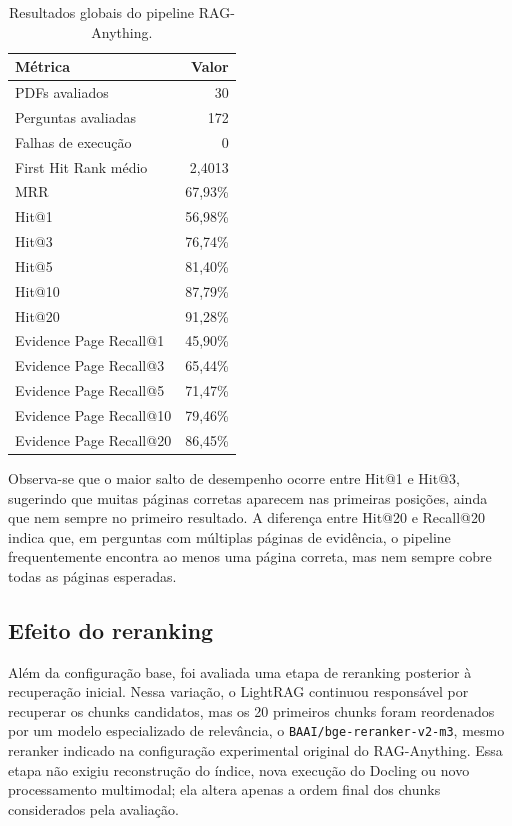 \begin{table}[htbp]
\centering
\caption{Resultados globais do pipeline RAG-Anything.}
\label{tab:resultados-gerais-raganything}
\small
\begin{tabular}{p{6.6cm}r}
\toprule
\textbf{Métrica} & \textbf{Valor} \\
\midrule
PDFs avaliados & 30 \\
Perguntas avaliadas & 172 \\
Falhas de execução & 0 \\
First Hit Rank médio & 2,4013 \\
MRR & 67,93\% \\
\addlinespace
Hit@1 & 56,98\% \\
Hit@3 & 76,74\% \\
Hit@5 & 81,40\% \\
Hit@10 & 87,79\% \\
Hit@20 & 91,28\% \\
\addlinespace
Evidence Page Recall@1 & 45,90\% \\
Evidence Page Recall@3 & 65,44\% \\
Evidence Page Recall@5 & 71,47\% \\
Evidence Page Recall@10 & 79,46\% \\
Evidence Page Recall@20 & 86,45\% \\
\bottomrule
\end{tabular}
\end{table}

Observa-se que o maior salto de desempenho ocorre entre Hit@1 e Hit@3, sugerindo que muitas páginas corretas aparecem nas primeiras posições, ainda que nem sempre no primeiro resultado. A diferença entre Hit@20 e Recall@20 indica que, em perguntas com múltiplas páginas de evidência, o pipeline frequentemente encontra ao menos uma página correta, mas nem sempre cobre todas as páginas esperadas.

\subsection{Efeito do reranking}
\label{subsec:raganything-reranking}

Além da configuração base, foi avaliada uma etapa de reranking posterior à recuperação inicial. Nessa variação, o LightRAG continuou responsável por recuperar os chunks candidatos, mas os 20 primeiros chunks foram reordenados por um modelo especializado de relevância, o \texttt{BAAI/bge-reranker-v2-m3}, mesmo reranker indicado na configuração experimental original do RAG-Anything. Essa etapa não exigiu reconstrução do índice, nova execução do Docling ou novo processamento multimodal; ela altera apenas a ordem final dos chunks considerados pela avaliação.


